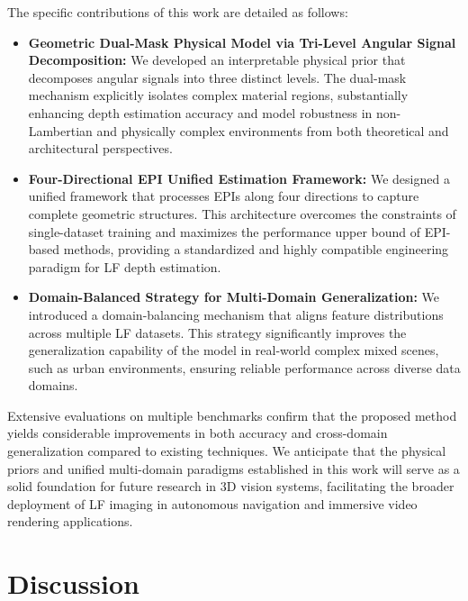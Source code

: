 \documentclass[lettersize,journal]{IEEEtran}
\begin{document}
The specific contributions of this work are detailed as follows:
\begin{itemize}
    \item \textbf{Geometric Dual-Mask Physical Model via Tri-Level Angular Signal Decomposition:} We developed an interpretable physical prior that decomposes angular signals into three distinct levels. The dual-mask mechanism explicitly isolates complex material regions, substantially enhancing depth estimation accuracy and model robustness in non-Lambertian and physically complex environments from both theoretical and architectural perspectives.
    \item \textbf{Four-Directional EPI Unified Estimation Framework:} We designed a unified framework that processes EPIs along four directions to capture complete geometric structures. This architecture overcomes the constraints of single-dataset training and maximizes the performance upper bound of EPI-based methods, providing a standardized and highly compatible engineering paradigm for LF depth estimation.
    \item \textbf{Domain-Balanced Strategy for Multi-Domain Generalization:} We introduced a domain-balancing mechanism that aligns feature distributions across multiple LF datasets. This strategy significantly improves the generalization capability of the model in real-world complex mixed scenes, such as urban environments, ensuring reliable performance across diverse data domains.
\end{itemize}

Extensive evaluations on multiple benchmarks confirm that the proposed method yields considerable improvements in both accuracy and cross-domain generalization compared to existing techniques. We anticipate that the physical priors and unified multi-domain paradigms established in this work will serve as a solid foundation for future research in 3D vision systems, facilitating the broader deployment of LF imaging in autonomous navigation and immersive video rendering applications.

\section{Discussion}
\end{document}
